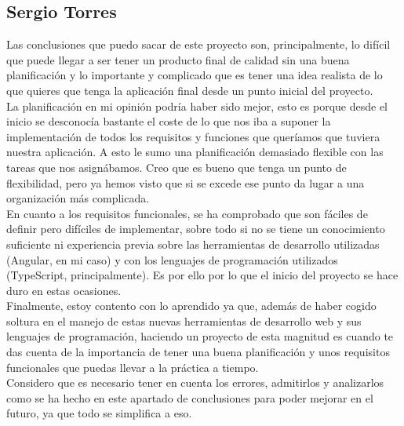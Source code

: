\documentclass{article}
\begin{document}
\subsection*{Sergio Torres}
Las conclusiones que puedo sacar de este proyecto son, principalmente, lo difícil que puede llegar a ser tener un producto final de calidad sin una buena planificación y lo importante y complicado que es tener una idea realista de lo que quieres que tenga la aplicación final desde un punto inicial del proyecto.\\
\hfill \break
La planificación en mi opinión podría haber sido mejor, esto es porque desde el inicio se desconocía bastante el coste de lo que nos iba a suponer la implementación de todos los requisitos y funciones que queríamos que tuviera nuestra aplicación. A esto le sumo una planificación demasiado flexible con las tareas que nos asignábamos. Creo que es bueno que tenga un punto de flexibilidad, pero ya hemos visto que si se excede ese punto da lugar a una organización más complicada.\\
\hfill \break
En cuanto a los requisitos funcionales, se ha comprobado que son fáciles de definir pero difíciles de implementar, sobre todo si no se tiene un conocimiento suficiente ni experiencia previa sobre las herramientas de desarrollo utilizadas (Angular, en mi caso) y con los lenguajes de programación utilizados (TypeScript, principalmente). Es por ello por lo que el inicio del proyecto se hace duro en estas ocasiones.\\
\hfill \break
Finalmente, estoy contento con lo aprendido ya que, además de haber cogido soltura en el manejo de estas nuevas herramientas de desarrollo web y sus lenguajes de programación, haciendo un proyecto de esta magnitud es cuando te das cuenta de la importancia de tener una buena planificación y unos requisitos funcionales que puedas llevar a la práctica a tiempo.\\
\hfill \break
Considero que es necesario tener en cuenta los errores, admitirlos y analizarlos como se ha hecho en este apartado de conclusiones para poder mejorar en el futuro, ya que todo se simplifica a eso.
\newpage
\end{document}
